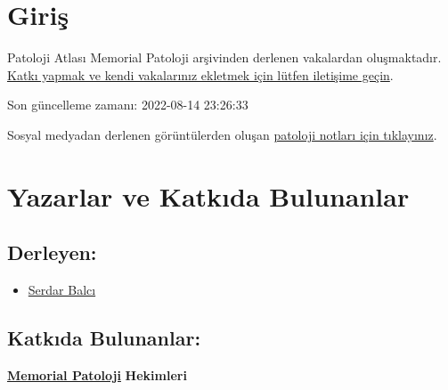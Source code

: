 \documentclass[
  letterpaper,
  DIV=11,
  numbers=noendperiod]{scrreprt}
\providecommand{\tightlist}{%
  \setlength{\itemsep}{0pt}\setlength{\parskip}{0pt}}\usepackage{longtable,booktabs,array}
\begin{document}

\hypertarget{giris}{%
\chapter*{Giriş}\label{giris}}

Patoloji Atlası Memorial Patoloji arşivinden derlenen vakalardan
oluşmaktadır.\\

\href{https://www.patolojiatlasi.com/katki.html}{Katkı yapmak ve kendi
vakalarınız ekletmek için lütfen iletişime geçin}.

Son güncelleme zamanı: 2022-08-14 23:26:33

Sosyal medyadan derlenen görüntülerden oluşan
\href{https://www.patolojinotlari.com/}{patoloji notları için
tıklayınız}.


\hypertarget{yazarlar-ve-katkux131da-bulunanlar}{%
\chapter*{Yazarlar ve Katkıda
Bulunanlar}\label{yazarlar-ve-katkux131da-bulunanlar}}

\hypertarget{derleyen}{%
\section*{Derleyen:}\label{derleyen}}

\begin{itemize}
\tightlist
\item
  \href{https://www.serdarbalci.com}{Serdar Balcı}
\end{itemize}

\hypertarget{katkux131da-bulunanlar}{%
\section*{Katkıda Bulunanlar:}\label{katkux131da-bulunanlar}}

\href{https://patoloji.memorial.com.tr/}{\textbf{Memorial Patoloji}}
\textbf{Hekimleri}
\end{document}
